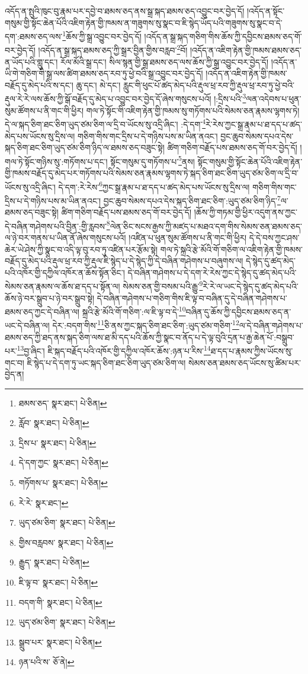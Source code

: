 འདོད་ན་སྤུའི་ཁུང་བུ་རྣམ་པར་དབྱེ་བ་ཐམས་ཅད་ནས་སྒྲ་སྐད་ཐམས་ཅད་འབྱུང་བར་བྱེད་དོ། །འདོད་ན་སྟོང་གསུམ་གྱི་སྟོང་ཆེན་པོའི་འཇིག་རྟེན་གྱི་ཁམས་ན་གཟུགས་སུ་སྣང་བ་ཇི་སྙེད་ཡོད་པའི་གཟུགས་སུ་སྣང་བ་དེ་དག་:ཐམས་ཅད་ལས་\footnote{ཐམས་ཅད་  སྣར་ཐང་།  པེ་ཅིན། }ཆོས་ཀྱི་སྒྲ་འབྱུང་བར་བྱེད་དོ། །འདོད་ན་སྒྲ་སྐད་གཅིག་གིས་ཆོས་ཀྱི་དབྱིངས་ཐམས་ཅད་གོ་བར་བྱེད་དོ། །འདོད་ན་སྒྲ་སྐད་ཐམས་ཅད་ཀྱི་སྒྲར་བྱིན་གྱིས་བརླབ་\footnote{རློབ་  སྣར་ཐང་།  པེ་ཅིན། }བོ། །འདོད་ན་འཇིག་རྟེན་གྱི་ཁམས་ཐམས་ཅད་ན་ཡོད་པའི་གླུ་དང་། རོལ་མོའི་སྒྲ་དང་། སིལ་སྙན་གྱི་སྒྲ་ཐམས་ཅད་ལས་ཆོས་ཀྱི་སྒྲ་འབྱུང་བར་བྱེད་དོ། །འདོད་ན་ཡི་གེ་གཅིག་གི་སྒྲ་ལས་ཚིག་ཐམས་ཅད་རབ་ཏུ་ཕྱེ་བའི་སྒྲ་འབྱུང་བར་བྱེད་དོ། །འདོད་ན་འཇིག་རྟེན་གྱི་ཁམས་བརྗོད་དུ་མེད་པའི་ས་དང་། ཆུ་དང་། མེ་དང་། རླུང་གི་ཕུང་པོ་ཚད་མེད་པའི་རྡུལ་ཕྲ་རབ་ཀྱི་རྡུལ་ཕྲ་རབ་ཏུ་ཕྱེ་བའི་རྡུལ་རེ་རེ་ལས་ཆོས་ཀྱི་སྒོ་བརྗོད་དུ་མེད་པ་འབྱུང་བར་བྱེད་དོ་ཞེས་གསུངས་པའོ། །:དྲིས་པའི་\footnote{དྲིས་པ་  སྣར་ཐང་།  པེ་ཅིན། }ལན་འདེབས་པ་ཕུན་སུམ་ཚོགས་པ་ནི་གང་གི་ཕྱིར། གལ་ཏེ་སྟོང་གི་འཇིག་རྟེན་གྱི་ཁམས་སུ་གཏོགས་པའི་སེམས་ཅན་རྣམས་ལྷགས་ཏེ། དེ་ལ་སྐད་ཅིག་ཐང་ཅིག་ཡུད་ཙམ་ཅིག་ལ་དྲི་བ་ཡོངས་སུ་འདྲི་ཞིང་། :དེ་དག་\footnote{དེ་དག་ཀྱང་  སྣར་ཐང་།  པེ་ཅིན། }རེ་རེས་ཀྱང་སྒྲ་རྣམ་པ་ཐ་དད་པ་ཚད་མེད་པས་ཡོངས་སུ་དྲིས་ལ། གཅིག་གིས་གང་དྲིས་པ་དེ་གཉིས་པས་མ་ཡིན་ནའང་། བྱང་ཆུབ་སེམས་དཔའ་དེས་སྐད་ཅིག་ཐང་ཅིག་ཡུད་ཙམ་ཅིག་ཉིད་ལ་ཐམས་ཅད་བཟུང་སྟེ། ཚིག་གཅིག་བརྗོད་པས་ཐམས་ཅད་གོ་བར་བྱེད་དོ། །གལ་ཏེ་སྟོང་གཉིས་སུ་:གཏོགས་པ་དང་། སྟོང་གསུམ་དུ་གཏོགས་པ་\footnote{གཏོགས་པ་  སྣར་ཐང་།  པེ་ཅིན། }ནས། སྟོང་གསུམ་གྱི་སྟོང་ཆེན་པོའི་འཇིག་རྟེན་གྱི་ཁམས་བརྗོད་དུ་མེད་པར་གཏོགས་པའི་སེམས་ཅན་རྣམས་ལྷགས་ཏེ་སྐད་ཅིག་ཐང་ཅིག་ཡུད་ཙམ་ཅིག་ལ་དྲི་བ་ཡོངས་སུ་འདྲི་ཞིང་། དེ་དག་:རེ་རེས་\footnote{རེ་རེ་  སྣར་ཐང་། }ཀྱང་སྒྲ་རྣམ་པ་ཐ་དད་པ་ཚད་མེད་པས་ཡོངས་སུ་དྲིས་ལ། གཅིག་གིས་གང་དྲིས་པ་དེ་གཉིས་པས་མ་ཡིན་ནའང་། བྱང་ཆུབ་སེམས་དཔའ་དེས་སྐད་ཅིག་ཐང་ཅིག་:ཡུད་ཙམ་ཅིག་ཉིད་\footnote{ཡུད་ཙམ་ཅིག་  སྣར་ཐང་།  པེ་ཅིན། }ལ་ཐམས་ཅད་བཟུང་སྟེ། ཚིག་གཅིག་བརྗོད་པས་ཐམས་ཅད་གོ་བར་བྱེད་དོ། །ཆོས་ཀྱི་གཏམ་གྱི་ཕྱིར་འདུག་ནས་ཀྱང་དེ་བཞིན་གཤེགས་པའི་བྱིན་:གྱི་རླབས་\footnote{གྱིས་བརླབས་  སྣར་ཐང་།  པེ་ཅིན། }ལེན་ཅིང་སངས་རྒྱས་ཀྱི་མཛད་པ་མཐའ་དག་གིས་སེམས་ཅན་ཐམས་ཅད་ལ་ཉེ་བར་གནས་པ་ཡིན་ནོ་ཞེས་གསུངས་པའོ། །འཛིན་པ་ཕུན་སུམ་ཚོགས་པ་ནི་གང་གི་ཕྱིར། དེ་དེ་བས་ཀྱང་ཤས་ཆེར་ཡེ་ཤེས་ཀྱི་སྣང་བ་འདི་ལྟ་བུ་རབ་ཏུ་འཛིན་པར་རྩོམ་སྟེ། གལ་ཏེ་སྐྲའི་རྩེ་མོའི་གོ་གཅིག་ལ་འཇིག་རྟེན་གྱི་ཁམས་བརྗོད་དུ་མེད་པའི་རྡུལ་ཕྲ་རབ་ཀྱི་རྡུལ་ཇི་སྙེད་པ་དེ་སྙེད་ཀྱི་དེ་བཞིན་གཤེགས་པ་བཞུགས་ལ། དེ་སྙེད་དུ་ཚད་མེད་པའི་འཁོར་གྱི་དཀྱིལ་འཁོར་ན་ཆོས་སྟོན་ཅིང་། དེ་བཞིན་གཤེགས་པ་དེ་དག་རེ་རེས་ཀྱང་དེ་སྙེད་དུ་ཚད་མེད་པའི་སེམས་ཅན་རྣམས་ལ་ཆོས་ཐ་དད་པ་སྟོན་ལ། སེམས་ཅན་གྱི་བསམ་པའི་རྒྱུ་\footnote{རྒྱུད་  སྣར་ཐང་།  པེ་ཅིན། }རེ་རེ་ལ་ཡང་དེ་སྙེད་དུ་ཚད་མེད་པའི་ཆོས་ཉེ་བར་སྒྲུབ་པ་ཉེ་བར་སྒྲུབ་སྟེ། དེ་བཞིན་གཤེགས་པ་གཅིག་གིས་ཇི་ལྟ་བ་བཞིན་དུ་དེ་བཞིན་གཤེགས་པ་ཐམས་ཅད་ཀྱང་དེ་བཞིན་ལ། སྐྲའི་རྩེ་མོའི་གོ་གཅིག་:ལ་ཇི་ལྟ་བ་དེ་\footnote{ཇི་ལྟ་བ་  སྣར་ཐང་།  པེ་ཅིན། }བཞིན་དུ་ཆོས་ཀྱི་དབྱིངས་ཐམས་ཅད་ན་ཡང་དེ་བཞིན་ལ། དེར་:བདག་གིས་\footnote{བདག་གི་  སྣར་ཐང་།  པེ་ཅིན། }ཅི་ནས་ཀྱང་སྐད་ཅིག་ཐང་ཅིག་:ཡུད་ཙམ་གཅིག་\footnote{ཡུད་ཙམ་ཅིག་  སྣར་ཐང་།  པེ་ཅིན། }ལ་དེ་བཞིན་གཤེགས་པ་ཐམས་ཅད་ཀྱི་ཐད་ནས་སྐད་ཅིག་ལས་ཐ་མི་དད་པའི་ཆོས་ཀྱི་སྣང་བ་ནོད་པ་དེ་ལྟ་བུའི་དྲན་པ་རྒྱ་ཆེན་པོ་:བསྒྲུབ་པར་\footnote{སྒྲུབ་པར་  སྣར་ཐང་།  པེ་ཅིན། }བྱ་ཞིང་། ཇི་སྐད་བརྗོད་པའི་འཁོར་གྱི་དཀྱིལ་འཁོར་ཆོས་:ཉན་པ་རིས་\footnote{ཉན་པའི་ས་  ཅོ་ནེ། }ཐ་དད་པ་རྣམས་ཀྱིས་ཡོངས་སུ་གང་བ། ཇི་སྙེད་པ་དེ་དག་ཏུ་ཡང་སྐད་ཅིག་ཐང་ཅིག་ཡུད་ཙམ་ཅིག་ལ། སེམས་ཅན་ཐམས་ཅད་ཡོངས་སུ་ཚིམ་པར་བྱེད་ན། 